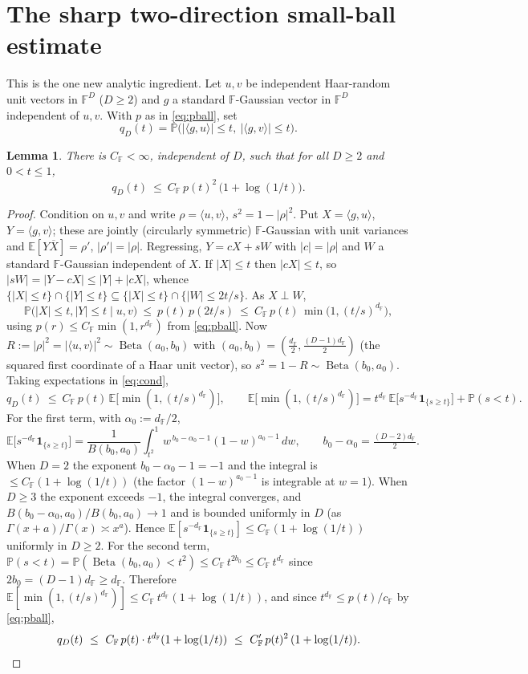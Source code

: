 \documentclass[11pt,reqno]{amsart}
\theoremstyle{plain}
\newtheorem{lemma}[theorem]{Lemma}
\theoremstyle{definition}
\theoremstyle{remark}
\newcommand{\F}{\mathbb{F}}
\newcommand{\PP}{\mathbb{P}}
\newcommand{\EE}{\mathbb{E}}
\newcommand{\one}{\mathbf{1}}
\newcommand{\dF}{d_{\F}}
\DeclareMathOperator{\Beta}{Beta}
\begin{document}
\section{The sharp two-direction small-ball estimate}\label{sec:twoslab}
This is the one new analytic ingredient. Let $u,v$ be independent Haar-random unit vectors in $\F^D$
($D\ge2$) and $g$ a standard $\F$-Gaussian vector in $\F^D$ independent of $u,v$. With $p$ as in
\eqref{eq:pball}, set
\[
  q_D(t)=\PP\bigl(|\langle g,u\rangle|\le t,\ |\langle g,v\rangle|\le t\bigr).
\]
\begin{lemma}\label{lem:twoslab}
There is $C_\F<\infty$, independent of $D$, such that for all $D\ge2$ and $0<t\le1$,
\[
  q_D(t)\ \le\ C_\F\,p(t)^2\,\bigl(1+\log(1/t)\bigr).
\]
\end{lemma}
\begin{proof}
Condition on $u,v$ and write $\rho=\langle u,v\rangle$, $s^2=1-|\rho|^2$. Put $X=\langle
g,u\rangle$, $Y=\langle g,v\rangle$; these are jointly (circularly symmetric) $\F$-Gaussian with unit
variances and $\EE[Y\overline X]=\rho'$, $|\rho'|=|\rho|$. Regressing, $Y=cX+sW$ with $|c|=|\rho|$ and
$W$ a standard $\F$-Gaussian independent of $X$. If $|X|\le t$ then $|cX|\le t$, so
$|sW|=|Y-cX|\le|Y|+|cX|$, whence $\{|X|\le t\}\cap\{|Y|\le t\}\subseteq\{|X|\le t\}\cap\{|W|\le
2t/s\}$. As $X\perp W$,
\begin{equation}\label{eq:cond}
  \PP\bigl(|X|\le t,|Y|\le t\mid u,v\bigr)\ \le\ p(t)\,p(2t/s)\ \le\ C_\F\,p(t)\,\min\!\bigl(1,(t/s)^{\dF}\bigr),
\end{equation}
using $p(r)\le C_\F\min(1,r^{\dF})$ from \eqref{eq:pball}. Now $R:=|\rho|^2=|\langle
u,v\rangle|^2\sim\Beta(a_0,b_0)$ with $(a_0,b_0)=(\tfrac{\dF}2,\tfrac{(D-1)\dF}2)$ (the squared first
coordinate of a Haar unit vector), so $s^2=1-R\sim\Beta(b_0,a_0)$. Taking expectations in
\eqref{eq:cond},
\[
  q_D(t)\ \le\ C_\F\,p(t)\,\EE\bigl[\min(1,(t/s)^{\dF})\bigr],\qquad
  \EE\bigl[\min(1,(t/s)^{\dF})\bigr]=t^{\dF}\,\EE\bigl[s^{-\dF}\one_{\{s\ge t\}}\bigr]+\PP(s<t).
\]
For the first term, with $\alpha_0:=\dF/2$,
\[
  \EE\bigl[s^{-\dF}\one_{\{s\ge t\}}\bigr]=\frac1{B(b_0,a_0)}\int_{t^2}^1 w^{\,b_0-\alpha_0-1}(1-w)^{a_0-1}\,dw,
  \qquad b_0-\alpha_0=\tfrac{(D-2)\dF}2 .
\]
When $D=2$ the exponent $b_0-\alpha_0-1=-1$ and the integral is $\le C_\F(1+\log(1/t))$ (the factor
$(1-w)^{a_0-1}$ is integrable at $w=1$). When $D\ge3$ the exponent exceeds $-1$, the integral
converges, and $B(b_0-\alpha_0,a_0)/B(b_0,a_0)\to1$ and is bounded uniformly in $D$ (as
$\Gamma(x+a)/\Gamma(x)\asymp x^{a}$). Hence $\EE[s^{-\dF}\one_{\{s\ge t\}}]\le C_\F(1+\log(1/t))$
uniformly in $D\ge2$. For the second term, $\PP(s<t)=\PP(\Beta(b_0,a_0)<t^2)\le C_\F\,t^{2b_0}\le
C_\F\,t^{\dF}$ since $2b_0=(D-1)\dF\ge\dF$. Therefore $\EE[\min(1,(t/s)^{\dF})]\le
C_\F\,t^{\dF}(1+\log(1/t))$, and since $t^{\dF}\le p(t)/c_\F$ by \eqref{eq:pball},
\[
  q_D(t)\ \le\ C_\F\,p(t)\cdot t^{\dF}(1+\log(1/t))\ \le\ C_\F'\,p(t)^2\,(1+\log(1/t)).\qedhere
\]
\end{proof}
\end{document}
